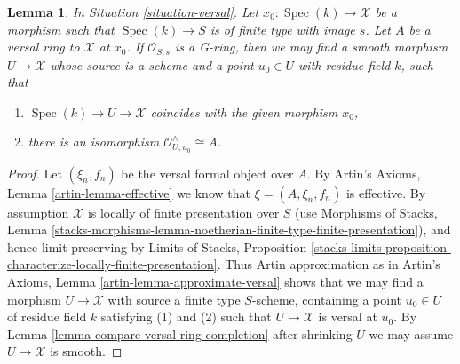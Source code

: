 \documentclass{stacks-project}
\theoremstyle{plain}
\newtheorem{lemma}[subsection]{Lemma}
\theoremstyle{definition}
\theoremstyle{remark}
\numberwithin{equation}{subsection}
\def\Spec{\mathop{\mathrm{Spec}}}
\begin{document}
\begin{lemma}
\label{lemma-Artin-approximation-by-smooth-morphism}
In Situation \ref{situation-versal}. Let $x_0 : \Spec(k) \to \mathcal{X}$
be a morphism such that $\Spec(k) \to S$ is of finite type with image $s$.
Let $A$ be a versal ring to $\mathcal{X}$ at $x_0$.
If $\mathcal{O}_{S, s}$ is a G-ring, then we may find a smooth morphism
$U \to \mathcal{X}$ whose source is a scheme and a point
$u_0 \in U$ with residue field $k$, such that
\begin{enumerate}
\item $\Spec(k) \to U \to \mathcal{X}$ coincides with the given morphism $x_0$,
\item there is an isomorphism $\mathcal{O}_{U, u_0}^\wedge \cong A$.
\end{enumerate}
\end{lemma}

\begin{proof}
Let $(\xi_n, f_n)$ be the versal formal object over $A$.
By Artin's Axioms, Lemma \ref{artin-lemma-effective}
we know that $\xi = (A, \xi_n, f_n)$ is effective.
By assumption $\mathcal{X}$ is locally of finite presentation over $S$
(use Morphisms of Stacks, Lemma
\ref{stacks-morphisms-lemma-noetherian-finite-type-finite-presentation}),
and hence limit preserving by Limits of Stacks, Proposition
\ref{stacks-limits-proposition-characterize-locally-finite-presentation}.
Thus Artin approximation as in
Artin's Axioms, Lemma \ref{artin-lemma-approximate-versal}
shows that we may find a morphism $U \to \mathcal{X}$ with
source a finite type $S$-scheme, containing a point $u_0 \in U$
of residue field $k$ satisfying (1) and (2) such that $U \to \mathcal{X}$
is versal at $u_0$. By Lemma \ref{lemma-compare-versal-ring-completion}
after shrinking $U$ we may assume $U \to \mathcal{X}$ is smooth.
\end{proof}
\end{document}
